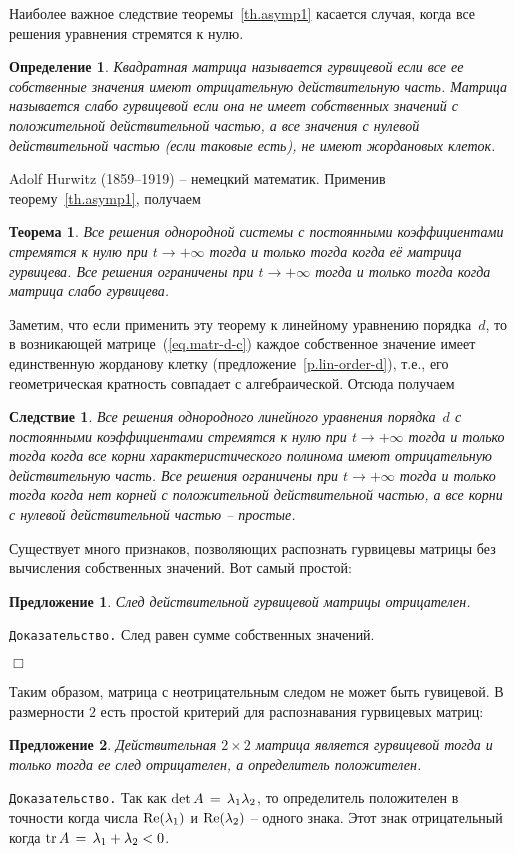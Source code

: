 \documentclass[12pt,a4paper]{article}
\newtheorem{theorem}{Теорема}
\newtheorem{prop}{Предложение}
\newtheorem{cor}{Следствие}
\newtheorem{defi}{Определение}
\begin{document}
Наиболее важное следствие теоремы~\ref{th.asymp1} касается случая, когда все решения уравнения стремятся к нулю.
\begin{defi}\label{d.hurw}
Квадратная матрица называется гурвицевой если все ее собственные значения имеют отрицательную
действительную часть. Матрица называется слабо гурвицевой если она не имеет собственных значений с
положительной действительной частью, а все значения с нулевой действительной частью (если таковые есть),
не имеют жордановых клеток.
\end{defi}
Adolf Hurwitz (1859--1919) -- немецкий математик.
Применив теорему~\ref{th.asymp1}, получаем
\begin{theorem}\label{th.asymp2}
Все решения однородной системы с постоянными коэффициентами стремятся к нулю при $t \to +\infty$ тогда и только тогда когда её матрица гурвицева. Все решения ограничены при $t \to +\infty$ тогда и только тогда когда матрица
слабо гурвицева.
\end{theorem}
Заметим, что если применить эту теорему к линейному уравнению порядка~$d$, то в возникающей матрице~(\ref{eq.matr-d-c})
каждое собственное значение имеет единственную жорданову клетку (предложение~\ref{p.lin-order-d}), т.е., его геометрическая кратность совпадает с алгебраической. Отсюда получаем
\begin{cor}\label{c.asymp2}
Все решения однородного линейного уравнения порядка~$d$ с постоянными коэффициентами стремятся к нулю при $t \to +\infty$ тогда и только тогда когда все корни характеристического полинома имеют отрицательную
действительную часть. Все решения ограничены при $t \to +\infty$ тогда и только тогда когда нет корней с положительной
действительной частью, а все корни с нулевой действительной частью -- простые.
\end{cor}
Существует много признаков, позволяющих распознать  гурвицевы матрицы без вычисления собственных значений.
Вот самый простой:
\begin{prop}\label{p.hurw1}
След действительной гурвицевой матрицы отрицателен.
\end{prop}
{\tt Доказательство.} След равен сумме собственных значений.

   {\hfill $\Box$}
\medskip

Таким образом, матрица с неотрицательным следом не может быть гувицевой.
В размерности $2$ есть простой критерий для распознавания гурвицевых матриц:
\begin{prop}\label{p.hurw2}
Действительная $2\times 2$ матрица является  гурвицевой тогда и только тогда
ее след отрицателен, а определитель положителен.
\end{prop}
{\tt Доказательство.} Так как ${\rm det } \, A \, = \, \lambda_1 \lambda_2$,
то определитель положителен в точности когда числа ${\rm Re} (\lambda_1)$ и ${\rm Re} (\lambda_2)$
-- одного знака. Этот знак отрицательный когда ${\rm tr}\, A \, = \, \lambda_1 + \lambda_2 < 0$.
\end{document}
